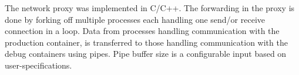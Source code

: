 The network proxy was implemented in C/C++.
The forwarding in the proxy is done by forking off multiple processes each handling one send/or receive connection in a loop.
Data from processes handling communication with the production container, is  transferred to those handling communication with the debug containers using pipes.
Pipe buffer size is a configurable input based on user-specifications. 
